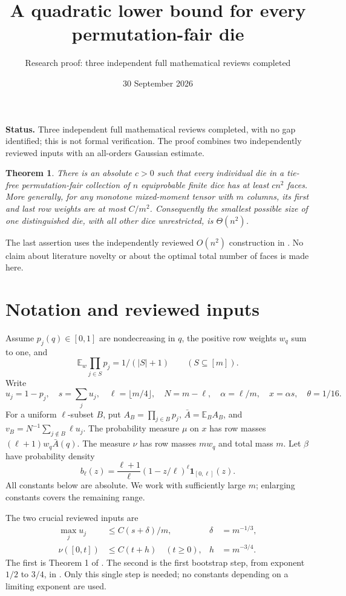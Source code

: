 \documentclass[11pt]{article}
\title{A quadratic lower bound for every permutation-fair die}
\author{Research proof: three independent full mathematical reviews completed}
\date{30 September 2026}
\newtheorem{theorem}{Theorem}
\newcommand{\E}{\mathbb E}
\begin{document}
\maketitle
\noindent\textbf{Status.} Three independent full mathematical reviews
completed, with no gap identified; this is not formal verification.
The proof combines two independently reviewed inputs with an
all-orders Gaussian estimate.

\begin{theorem}\label{main}
There is an absolute $c>0$ such that every individual die in a tie-free
permutation-fair collection of $n$ equiprobable finite dice has at least
$cn^2$ faces. More generally, for any monotone mixed-moment tensor with
$m$ columns, its first and last row weights are at most $C/m^2$.
Consequently the smallest possible size of one distinguished die,
with all other dice unrestricted, is $\Theta(n^2)$.
\end{theorem}
The last assertion uses the independently reviewed $O(n^2)$ construction
in . No claim about literature
novelty or about the optimal total number of faces is made here.

\section*{Notation and reviewed inputs}
Assume $p_j(q)\in[0,1]$ are nondecreasing in $q$, the positive row weights
$w_q$ sum to one, and
\[
 \E_w\prod_{j\in S}p_j=1/(|S|+1)\qquad(S\subseteq[m]).
\]
Write
\[
 u_j=1-p_j,\quad s=\sum_j u_j,\quad
 \ell=\lfloor m/4\rfloor,\quad N=m-\ell,\quad
 \alpha=\ell/m,\quad x=\alpha s,\quad\theta=1/16.
\]
For a uniform $\ell$-subset $B$, put
$A_B=\prod_{j\in B}p_j$, $\bar A=\E_B A_B$, and
$v_B=N^{-1}\sum_{j\notin B}\ell u_j$.
The probability measure $\mu$ on $x$ has row masses
$(\ell+1)w_q\bar A(q)$. The measure $\nu$ has row masses $mw_q$ and
total mass $m$. Let $\beta$ have probability density
\[
 b_\ell(z)=\frac{\ell+1}{\ell}(1-z/\ell)^\ell
                         \boldsymbol1_{[0,\ell]}(z).
\]
All constants below are absolute. We work with sufficiently large $m$;
enlarging constants covers the remaining range.

The two crucial reviewed inputs are
\begin{align}
 \max_j u_j&\le C(s+\delta)/m,
       &\delta&=m^{-1/3},\label{relative}\\
 \nu([0,t])&\le C(t+h)\quad(t\ge0),
       &h&=m^{-3/4}.\label{cdf}
\end{align}
The first is Theorem 1 of
.
The second is the first bootstrap step, from exponent $1/2$ to $3/4$,
in . Only this single step
is needed; no constants depending on a limiting exponent are used.
\end{document}
